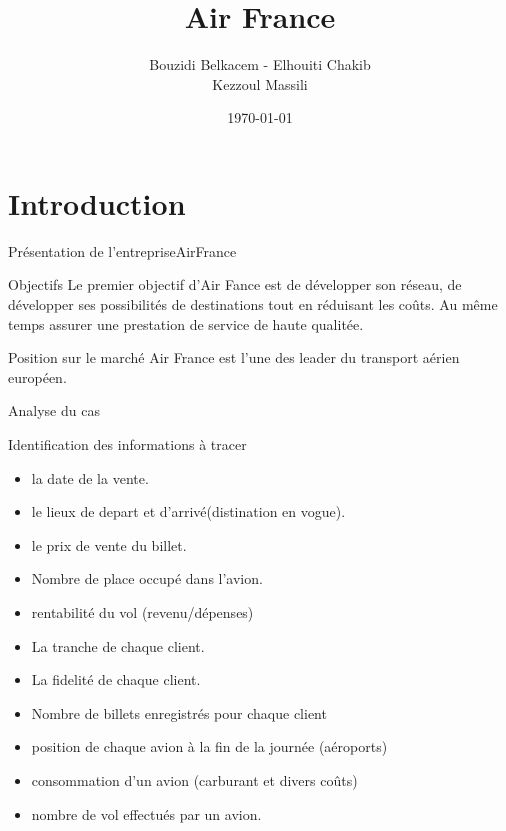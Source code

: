 \documentclass[10pt,handout]{beamer}
\title[Mini-Projet Entrepôt de données]{Air France}
\author[Bouzidi, Elhouiti, Kezzoul]{Bouzidi Belkacem - Elhouiti Chakib \\ Kezzoul Massili}
\institute[]{Université de Montpellier}
\date{\today}
\newif\ifplacelogo %
\begin{document}
\placelogofalse
\begin{frame}
	\titlepage
\end{frame}

\placelogotrue


\section{Introduction}
\placelogofalse
\begin{frame}{Présentation de l'entreprise}{AirFrance}
  \begin{block}{Objectifs}
    Le premier objectif d’Air Fance est de développer son réseau, de développer ses possibilités de destinations tout en réduisant les coûts. Au même temps assurer une prestation de service de haute qualitée.
  \end{block}

  \begin{block}{Position sur le marché}
    Air France est l’une des leader du transport aérien européen.
  \end{block}

\end{frame}

\begin{frame}{Analyse du cas}
  \begin{block}{Identification des informations à tracer}
    \begin{itemize}
     \item la date de la vente.
     \item le lieux de depart et d’arrivé(distination en vogue).
     \item le prix de vente du billet.
     \item Nombre de place occupé dans l’avion.
     \item rentabilité du vol (revenu/dépenses)
     \item La tranche de chaque client.
     \item La fidelité de chaque client.
     \item Nombre de billets enregistrés pour chaque client
     \item position de chaque avion à la fin de la journée (aéroports)
     \item consommation d’un avion (carburant et divers coûts)
     \item nombre de vol effectués par un avion.
    \end{itemize}
  \end{block}
\end{frame}
\end{document}
